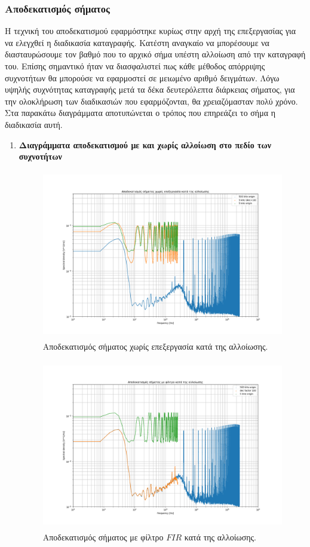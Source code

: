 \documentclass[breaklines=true, 12pt]{article}
\begin{document}
\subsubsection{Αποδεκατισμός σήματος}
\label{sec:orgde16686}
\label{sec:decimation-chapter}
Η τεχνική του αποδεκατισμού εφαρμόστηκε κυρίως στην αρχή της επεξεργασίας
για να ελεγχθεί η διαδικασία καταγραφής. Κατέστη αναγκαίο να μπορέσουμε
να διασταυρώσουμε τον βαθμό που το αρχικό σήμα υπέστη αλλοίωση από την
καταγραφή του. Επίσης σημαντικό ήταν να διασφαλιστεί πως κάθε μέθοδος
απόρριψης συχνοτήτων θα μπορούσε να εφαρμοστεί σε μειωμένο αριθμό
δειγμάτων. Λόγω υψηλής συχνότητας καταγραφής μετά τα δέκα δευτερόλεπτα
διάρκειας σήματος, για την ολοκλήρωση των διαδικασιών που εφαρμόζονται, θα
χρειαζόμασταν πολύ χρόνο. Στα παρακάτω διαγράμματα αποτυπώνεται ο τρόπος
που επηρεάζει το σήμα η διαδικασία αυτή.
\begin{enumerate}
\item \textbf{Διαγράμματα αποδεκατισμού με και χωρίς αλλοίωση στο πεδίο των συχνοτήτων}
\label{sec:org3882a00}
\begin{figure}[htbp]
\centering
\includegraphics[width=500px,height=280px]{./decimation/with_aliasing.png}
\caption{Αποδεκατισμός σήματος χωρίς επεξεργασία κατά της αλλοίωσης.}
\end{figure}

\begin{figure}[htbp]
\centering
\includegraphics[width=500px,height=280px]{./decimation/anti_aliasing_fir.png}
\caption{Αποδεκατισμός σήματος με φίλτρο \(FIR\) κατά της αλλοίωσης.}
\end{figure}


\end{enumerate}
\end{document}
